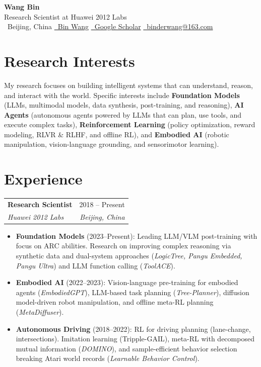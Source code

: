 \documentclass[10pt, a4paper]{article}
\makeatletter
\newcommand{\cventry}[4]{%
  \begin{tabular*}{\linewidth}{@{}l@{\extracolsep{\fill}}r@{}}
    \textbf{#1} & {#4} \\[-0.1em]
    \textit{\small #2} & \textit{\small #3}
  \end{tabular*}%
  \vspace{0.1em}%
}
\makeatother
\begin{document}
\pagestyle{empty}

\begin{center}
  {\LARGE\bfseries Wang Bin}\\[0.35em]
  {\small Research Scientist at Huawei 2012 Labs}\\[0.45em]
  {\small
    \faMapMarker*\ Beijing, China\quad
    \href{https://www.linkedin.com/in/bin-wang-85a164147/}{\faLinkedin\ Bin Wang}\quad
    \href{https://scholar.google.com/citations?user=KWZG_YsAAAAJ&hl=en}{\faGraduationCap\ Google Scholar}\quad
    \href{mailto:binderwang@163.com}{\faEnvelope\ binderwang@163.com}
  }
\end{center}
\vspace{0.3em}

\section{Research Interests}
{\small
My research focuses on building intelligent systems that can understand, reason, and interact with the world.
Specific interests include \textbf{Foundation Models} (LLMs, multimodal models, data synthesis, post-training, and reasoning),
\textbf{AI Agents} (autonomous agents powered by LLMs that can plan, use tools, and execute complex tasks),
\textbf{Reinforcement Learning} (policy optimization, reward modeling, RLVR \& RLHF, and offline RL),
and \textbf{Embodied AI} (robotic manipulation, vision-language grounding, and sensorimotor learning).
}

\section{Experience}

\cventry{Research Scientist}{Huawei 2012 Labs}{Beijing, China}{2018 -- Present}
\begin{itemize}[leftmargin=1.5em, itemsep=0.1em, topsep=0.15em, parsep=0pt, label=\textbullet]
  \item {\small \textbf{Foundation Models} (2023--Present): Leading LLM/VLM post-training with focus on ARC abilities.
    Research on improving complex reasoning via synthetic data and dual-system approaches
    (\textit{LogicTree, Pangu Embedded, Pangu Ultra}) and LLM function calling (\textit{ToolACE}).}
  \item {\small \textbf{Embodied AI} (2022--2023): Vision-language pre-training for embodied agents (\textit{EmbodiedGPT}),
    LLM-based task planning (\textit{Tree-Planner}), diffusion model-driven robot manipulation,
    and offline meta-RL planning (\textit{MetaDiffuser}).}
  \item {\small \textbf{Autonomous Driving} (2018--2022): RL for driving planning (lane-change, intersections).
    Imitation learning (Tripple-GAIL), meta-RL with decomposed mutual information (\textit{DOMINO}),
    and sample-efficient behavior selection breaking Atari world records (\textit{Learnable Behavior Control}).}
\end{itemize}
\end{document}
